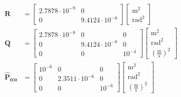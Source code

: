 \documentclass[a4paper,kul]{kulakarticle} %
\begin{document}
\begin{align}
	\mathbf{R} &= \begin{bmatrix} 2.7878\cdot 10^{-9} & 0 \\ 0 & 9.4124\cdot 10^{-6}\end{bmatrix} \begin{bmatrix} \text{m}^2 \\ \text{rad}^2 \end{bmatrix} \label{eq:R}\\	
	\mathbf{Q} &= \begin{bmatrix} 2.7878\cdot 10^{-8} & 0 & 0\\ 0 & 9.4124\cdot 10^{-8} & 0 \\ 0&0& 10^{-4}\end{bmatrix} \begin{bmatrix} \text{m}^2 \\ \text{rad}^2 \\ \left(\frac{\text{m}}{\text{s}}\right)^2\end{bmatrix} \label{eq:eq28}\\
	\mathbf{\hat{P}_{0|0}} &= \begin{bmatrix} 10^{-6} & 0 & 0\\ 0 & 2.3511\cdot 10^{-6} & 0 \\ 0&0& 10^{-6}\end{bmatrix} \begin{bmatrix} \text{m}^2 \\ \text{rad}^2 \\ \left(\frac{\text{m}}{\text{s}}\right)^2\end{bmatrix} \label{eq:phat00}
\end{align}
\end{document}
